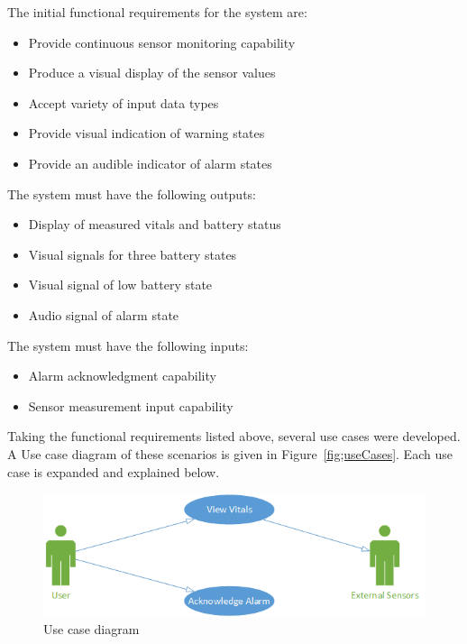 \documentclass[12pt]{article} %
\begin{document}
\begin{itemize}[$$]
  \item The initial functional requirements for the system are:
    \begin{itemize}[$\bullet$]
      \item Provide continuous sensor monitoring capability
      \item Produce a visual display of the sensor values
      \item Accept variety of input data types
      \item Provide visual indication of warning states
      \item Provide an audible indicator of alarm states
    \end{itemize}
\end{itemize}

\begin{itemize}[$$]
 \item The system must have the following outputs:
    \begin{itemize}[$\bullet$]
      \item Display of measured vitals and battery status
      \item Visual signals for three battery states
      \item Visual signal of low battery state
      \item Audio signal of alarm state
    \end{itemize}
\end{itemize}

\begin{itemize}[$$]
  \item The system must have the following inputs:
    \begin{itemize}[$\bullet$]
      \item Alarm acknowledgment capability
      \item Sensor measurement input capability
    \end{itemize}
\end{itemize}

Taking the functional requirements listed above, several use cases were
 developed. A Use case diagram of these scenarios is given in Figure~\ref{fig;useCases}. Each use case is expanded and explained below.

\begin{figure}
	\centering
	\includegraphics[width=\textwidth]{../design/use_cases_graphical.png}
	\caption{Use case diagram}
	\label{fig:useCases}
\end{figure}
\end{document}

